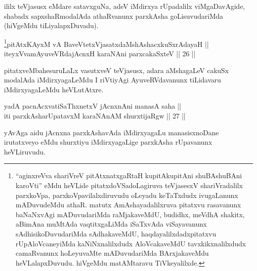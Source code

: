 \begin{artha}
ililx teVjasusx eMdare satavxguNa, adeV iMdirxya
rUpadalilx viMgaDavAgide, shabadx sapxshaRmodalAda athaRvanunx
parxkAsha goLisuvudariMda (hiVgeMdu tiLiyalapxDuvadu).
\end{artha}


\begin{shl}
\footnote{``aginxreVva shariVreV pitAtxnatxgaRtaH kupitAkupitAni shuBAshuBAni karoVti'' eMdu heVLide pitatxdoVSadoLagiruva teVjasesxV shariVradalilx parxkoVpa, parxkoVpavilalxdiruvudu oLeyadu keTaTxdudx
ivugaLanunx mADuvudeMdu athaR. matutx AmAshayadalilxruva pitatxvu rasavanunx baNaNxvAgi
mADuvudariMda raMjakaveMdU, budidhx, meVdhA shakitx, aBimAna muMtAda
vaqtitxgaLiMda iSaTxvAda viSayavanunx sAdhisikoDuvudariMda
sAdhakaveMdU, haqdayalilxdadxpitatxvu rUpAloVcaneyiMda
kaNiNxnalilxdudx AloVcakaveMdU tavxkikxnalilxdudx camaRvanunx
hoLeyuvaMte mADuvudariMda BArxjakaveMdu heVLalapxDuvudu. hiVgeMdu
matAMtaravu TiVkeyalilxde.}pitAtxKAyxM vA BaveVtetxVjasatxdaMshAshacxkuSxrAdayaH ||  \\
iteyxVvamAyuveVRdajAcnxH karaNAni parxcakaSxteV \hfill || 26 ||

\end{shl}

\begin{artha}
pitatxveMbahesuruLaLx vasutxveV teVjasusx, adara aMshagaLeV cakuSx
modalAda iMdirxyagaLeMdu I riVtiyAgi AyuveRVdavanunx tiLidavaru
iMdirxyagaLeMdu heVLutAtxre.
\end{artha}


\begin{shl}
yadA pacnAcxvatiSaThxnetxV jAcnxnAni manasA saha || \\
iti parxkAsharUpatavxM karaNAnAM shurxtijaRgw \hfill || 27 ||
  
\end{shl}

\begin{artha}
yAvAga aidu jAcnxna parxkAshavAda iMdirxyagaLu manasisxnoDane
irutatxveyo eMdu shurxtiyu iMdirxyagaLige parxkAsha rUpavanunx
heVLiruvudu.
\end{artha}


